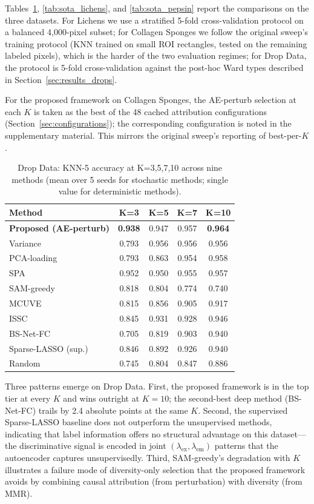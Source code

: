 Tables~\ref{tab:sota_drops}, \ref{tab:sota_lichens}, and \ref{tab:sota_pepsin} report the comparisons on the three datasets.
For Lichens we use a stratified 5-fold cross-validation protocol on a balanced 4{,}000-pixel subset; for Collagen Sponges we follow the original sweep's training protocol (KNN trained on small ROI rectangles, tested on the remaining labeled pixels), which is the harder of the two evaluation regimes; for Drop Data, the protocol is 5-fold cross-validation against the post-hoc Ward types described in Section~\ref{sec:results_drops}.

For the proposed framework on Collagen Sponges, the AE-perturb selection at each $K$ is taken as the best of the 48 cached attribution configurations (Section~\ref{sec:configurations}); the corresponding configuration is noted in the supplementary material. This mirrors the original sweep's reporting of best-per-$K$.

\begin{table}[!t]
\centering
\caption{Drop Data: KNN-5 accuracy at K=3,5,7,10 across nine methods (mean over 5 seeds for stochastic methods; single value for deterministic methods).}
\label{tab:sota_drops}
\begin{tabular}{@{}lcccc@{}}
\toprule
\textbf{Method} & \textbf{K=3} & \textbf{K=5} & \textbf{K=7} & \textbf{K=10} \\
\midrule
\textbf{Proposed (AE-perturb)} & \textbf{0.938} & 0.947 & 0.957 & \textbf{0.964} \\
\midrule
Variance & 0.793 & 0.956 & 0.956 & 0.956 \\
PCA-loading & 0.793 & 0.863 & 0.954 & 0.958 \\
SPA & 0.952 & 0.950 & 0.955 & 0.957 \\
SAM-greedy & 0.818 & 0.804 & 0.774 & 0.740 \\
MCUVE & 0.815 & 0.856 & 0.905 & 0.917 \\
ISSC & 0.845 & 0.931 & 0.928 & 0.946 \\
BS-Net-FC~\cite{cai2020bsnet} & 0.705 & 0.819 & 0.903 & 0.940 \\
Sparse-LASSO (sup.) & 0.846 & 0.892 & 0.926 & 0.940 \\
Random & 0.745 & 0.804 & 0.847 & 0.886 \\
\bottomrule
\end{tabular}
\end{table}

Three patterns emerge on Drop Data.
First, the proposed framework is in the top tier at every $K$ and wins outright at $K=10$; the second-best deep method (BS-Net-FC) trails by 2.4 absolute points at the same $K$.
Second, the supervised Sparse-LASSO baseline does not outperform the unsupervised methods, indicating that label information offers no structural advantage on this dataset---the discriminative signal is encoded in joint $(\lambda_{\text{ex}}, \lambda_{\text{em}})$ patterns that the autoencoder captures unsupervisedly.
Third, SAM-greedy's degradation with $K$ illustrates a failure mode of diversity-only selection that the proposed framework avoids by combining causal attribution (from perturbation) with diversity (from MMR).

